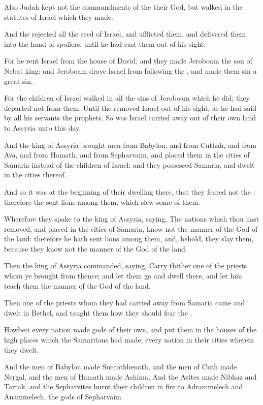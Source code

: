 \verse Also Judah kept not the commandments of the \LORD their God, but walked in the statutes of Israel which they made.

\verse And the \LORD rejected all the seed of Israel, and afflicted them, and delivered them into the hand of spoilers, until he had cast them out of his sight.

\verse For he rent Israel from the house of David; and they made Jeroboam the son of Nebat king: and Jeroboam drave Israel from following the \LORD, and made them sin a great sin.

\verse For the children of Israel walked in all the sins of Jeroboam which he did; they departed not from them; \verse Until the \LORD removed Israel out of his sight, as he had said by all his servants the prophets. So was Israel carried away out of their own land to Assyria unto this day.

\verse And the king of Assyria brought men from Babylon, and from Cuthah, and from Ava, and from Hamath, and from Sepharvaim, and placed them in the cities of Samaria instead of the children of Israel: and they possessed Samaria, and dwelt in the cities thereof.

\verse And so it was at the beginning of their dwelling there, that they feared not the \LORD: therefore the \LORD sent lions among them, which slew some of them.

\verse Wherefore they spake to the king of Assyria, saying, The nations which thou hast removed, and placed in the cities of Samaria, know not the manner of the God of the land: therefore he hath sent lions among them, and, behold, they slay them, because they know not the manner of the God of the land.

\verse Then the king of Assyria commanded, saying, Carry thither one of the priests whom ye brought from thence; and let them go and dwell there, and let him teach them the manner of the God of the land.

\verse Then one of the priests whom they had carried away from Samaria came and dwelt in Bethel, and taught them how they should fear the \LORD.

\verse Howbeit every nation made gods of their own, and put them in the houses of the high places which the Samaritans had made, every nation in their cities wherein they dwelt.

\verse And the men of Babylon made Succothbenoth, and the men of Cuth made Nergal, and the men of Hamath made Ashima, \verse And the Avites made Nibhaz and Tartak, and the Sepharvites burnt their children in fire to Adrammelech and Anammelech, the gods of Sepharvaim.

